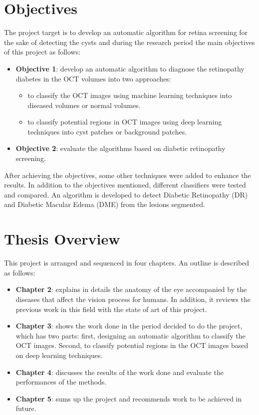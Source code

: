 \section{Objectives} \label{sect:thefirst}
The project target is to develop an automatic algorithm for retina screening for the sake of detecting the cysts and during the research period the main objectives of this project as follows:

\begin{itemize}
\item \textbf{Objective 1}: develop an automatic algorithm to diagnose the retinopathy diabetes in the OCT volumes into two approaches:
\begin{itemize}
\item to classify the OCT images using machine learning techniques into diseased volumes or normal volumes.
\item to classify potential regions in OCT images using deep learning techniques into cyst patches or background patches.
\end{itemize}

\item \textbf{Objective 2}: evaluate the algorithms based on diabetic retinopathy screening. 
\end{itemize}

After achieving the objectives, some other techniques were added to enhance the results.
In addition to the objectives mentioned, different classifiers were tested and compared.
An algorithm is developed to detect Diabetic Retinopathy (DR) and Diabetic Macular Edema (DME) from the lesions segmented.

\section{Thesis Overview}
This project is arranged and sequenced in four chapters. An outline is described as follows:

\begin{itemize}
\item \textbf{Chapter 2}: explains in details the anatomy of the eye accompanied by the diseases that affect the vision process for humans.
In addition, it reviews the previous work in this field with the state of art of this project.

\item \textbf{Chapter 3}: shows the work done in the period decided to do the project, which has two parts: first, designing an automatic algorithm to classify the OCT images.
Second, to classify potential regions in the OCT images based on deep learning techniques.

\item \textbf{Chapter 4}: discusses the results of the work done and evaluate the performances of the methods.

\item \textbf{Chapter 5}: sums up the project and recommends work to be achieved in future.  
\end{itemize}

